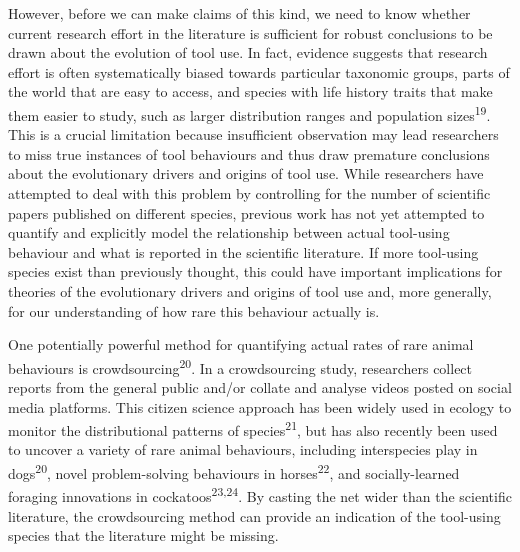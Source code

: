 \documentclass[
  man,floatsintext]{apa6}
\begin{document}
However, before we can make claims of this kind, we need to know whether current research effort in the literature is sufficient for robust conclusions to be drawn about the evolution of tool use. In fact, evidence suggests that research effort is often systematically biased towards particular taxonomic groups, parts of the world that are easy to access, and species with life history traits that make them easier to study, such as larger distribution ranges and population sizes\textsuperscript{19}. This is a crucial limitation because insufficient observation may lead researchers to miss true instances of tool behaviours and thus draw premature conclusions about the evolutionary drivers and origins of tool use. While researchers have attempted to deal with this problem by controlling for the number of scientific papers published on different species, previous work has not yet attempted to quantify and explicitly model the relationship between actual tool-using behaviour and what is reported in the scientific literature. If more tool-using species exist than previously thought, this could have important implications for theories of the evolutionary drivers and origins of tool use and, more generally, for our understanding of how rare this behaviour actually is.

One potentially powerful method for quantifying actual rates of rare animal behaviours is crowdsourcing\textsuperscript{20}. In a crowdsourcing study, researchers collect reports from the general public and/or collate and analyse videos posted on social media platforms. This citizen science approach has been widely used in ecology to monitor the distributional patterns of species\textsuperscript{21}, but has also recently been used to uncover a variety of rare animal behaviours, including interspecies play in dogs\textsuperscript{20}, novel problem-solving behaviours in horses\textsuperscript{22}, and socially-learned foraging innovations in cockatoos\textsuperscript{23,24}. By casting the net wider than the scientific literature, the crowdsourcing method can provide an indication of the tool-using species that the literature might be missing.
\end{document}
